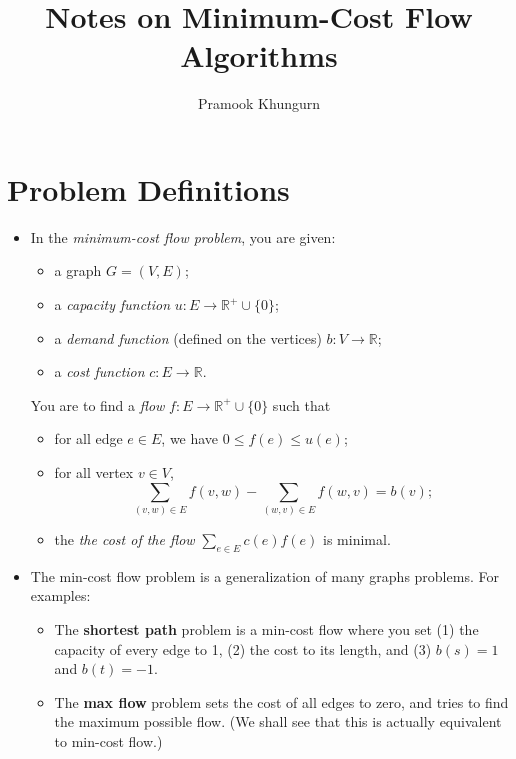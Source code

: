 \documentclass[10pt]{article}
\title{Notes on Minimum-Cost Flow Algorithms}
\author{Pramook Khungurn}
\begin{document}
  \maketitle
  
  \section{Problem Definitions} %
  \label{sec:problem-definition}
  
    \begin{itemize}
      \item In the \emph{minimum-cost flow problem}, you are given:
        \begin{itemize}
          \item a graph $G = (V,E)$;
          \item a \emph{capacity function} $u: E \rightarrow \mathbb{R}^{+} \cup \{ 0 \}$;
          \item a \emph{demand function} (defined on the vertices) $b: V \rightarrow \mathbb{R}$;
          \item a \emph{cost function} $c: E \rightarrow \mathbb{R}$.
        \end{itemize}
        You are to find a \emph{flow} $f: E \rightarrow \mathbb{R}^{+} \cup \{ 0 \}$ such that
        \begin{itemize}
          \item for all edge $e \in E$, we have $0 \leq f(e) \leq u(e)$;
          \item for all vertex $v \in V$, $$\sum_{(v,w) \in E} f(v,w) - \sum_{(w,v) \in E} f(w,v) = b(v);$$
          \item the \emph{the cost of the flow} $\sum_{e \in E} c(e)f(e)$ is minimal.
        \end{itemize}
      
      \item The min-cost flow problem is a generalization of many graphs problems. For examples:
        \begin{itemize}
          \item The {\bf shortest path} problem is a min-cost flow where you set
            (1) the capacity of every edge to 1, (2) the cost to its length,
            and (3) $b(s) = 1$ and $b(t) = -1.$
          
          \item The {\bf max flow} problem sets the cost of all edges to zero,
            and tries to find the maximum possible flow. (We shall see
            that this is actually equivalent to min-cost flow.)
          

\end{itemize}
\end{itemize}
\end{document}
